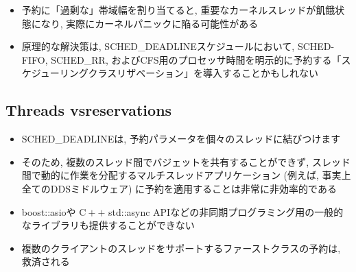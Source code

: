 \begin{frame}{}
    \begin{itemize}
        \item 予約に「過剰な」帯域幅を割り当てると, 重要なカーネルスレッドが飢餓状態になり, 実際にカーネルパニックに陥る可能性がある
        \item 原理的な解決策は, SCHED\_DEADLINEスケジュールにおいて, SCHED-FIFO, SCHED\_RR, およびCFS用のプロセッサ時間を明示的に予約する「スケジューリングクラスリザベーション」を導入することかもしれない
    \end{itemize}
\end{frame}



\subsection{Threads vsreservations}
\label{ssec: threads vs reservations}

\begin{frame}{}
    \begin{itemize}
        \item SCHED\_DEADLINEは, 予約パラメータを個々のスレッドに結びつけます
        \item そのため, 複数のスレッド間でバジェットを共有することができず, スレッド間で動的に作業を分配するマルチスレッドアプリケーション (例えば, 事実上全てのDDSミドルウェア) に予約を適用することは非常に非効率的である
        \item boost::asioや $\mathrm{C}++$ std::async APIなどの非同期プログラミング用の一般的なライブラリも提供することができない
        \item 複数のクライアントのスレッドをサポートするファーストクラスの予約は, 救済される
    \end{itemize}
\end{frame}
